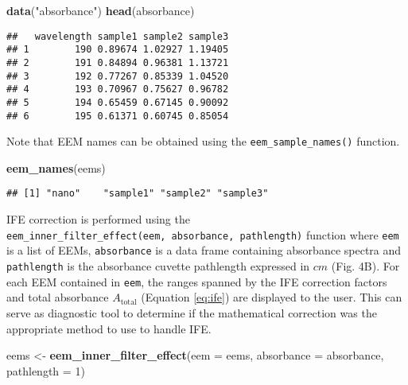 \documentclass[]{book}
\newenvironment{Shaded}{\begin{snugshade}}{\end{snugshade}}
\newcommand{\KeywordTok}[1]{\textcolor[rgb]{0.13,0.29,0.53}{\textbf{{#1}}}}
\newcommand{\DataTypeTok}[1]{\textcolor[rgb]{0.13,0.29,0.53}{{#1}}}
\newcommand{\DecValTok}[1]{\textcolor[rgb]{0.00,0.00,0.81}{{#1}}}
\newcommand{\StringTok}[1]{\textcolor[rgb]{0.31,0.60,0.02}{{#1}}}
\newcommand{\NormalTok}[1]{{#1}}
\begin{document}
\begin{Shaded}
\begin{Highlighting}[]
\KeywordTok{data}\NormalTok{(}\StringTok{"absorbance"}\NormalTok{)}
\KeywordTok{head}\NormalTok{(absorbance)}
\end{Highlighting}
\end{Shaded}

\begin{verbatim}
##   wavelength sample1 sample2 sample3
## 1        190 0.89674 1.02927 1.19405
## 2        191 0.84894 0.96381 1.13721
## 3        192 0.77267 0.85339 1.04520
## 4        193 0.70967 0.75627 0.96782
## 5        194 0.65459 0.67145 0.90092
## 6        195 0.61371 0.60745 0.85054
\end{verbatim}

Note that EEM names can be obtained using the
\texttt{eem\_sample\_names()} function.

\begin{Shaded}
\begin{Highlighting}[]
\KeywordTok{eem_names}\NormalTok{(eems)}
\end{Highlighting}
\end{Shaded}

\begin{verbatim}
## [1] "nano"    "sample1" "sample2" "sample3"
\end{verbatim}

IFE correction is performed using the
\texttt{eem\_inner\_filter\_effect(eem,\ absorbance,\ pathlength)}
function where \texttt{eem} is a list of EEMs, \texttt{absorbance} is a
data frame containing absorbance spectra and \texttt{pathlength} is the
absorbance cuvette pathlength expressed in \(cm\) (Fig. 4B). For each
EEM contained in \texttt{eem}, the ranges spanned by the IFE correction
factors and total absorbance \(A_{\text{total}}\) (Equation
\ref{eq:ife}) are displayed to the user. This can serve as diagnostic
tool to determine if the mathematical correction was the appropriate
method to use to handle IFE.

\begin{Shaded}
\begin{Highlighting}[]
\NormalTok{eems <-}\StringTok{ }\KeywordTok{eem_inner_filter_effect}\NormalTok{(}\DataTypeTok{eem =} \NormalTok{eems,}
                                \DataTypeTok{absorbance =} \NormalTok{absorbance,}
                                \DataTypeTok{pathlength =} \DecValTok{1}\NormalTok{)}
\end{Highlighting}
\end{Shaded}
\end{document}
